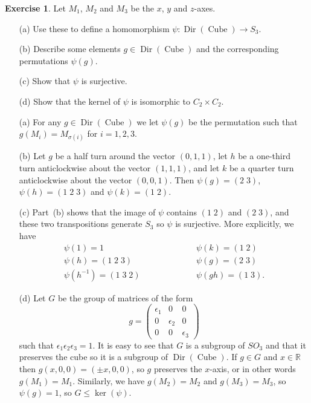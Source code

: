 \documentclass{amsart}
\DeclareMathOperator{\Dir}{Dir}
\DeclareMathOperator{\Cube}{Cube}
\newcommand{\xra}{\xrightarrow}
\renewcommand{\:}{\colon}
\newcommand{\tm}{\times}
\newcommand{\bsm}       {\left(\begin{smallmatrix}}
\newcommand{\esm}       {\end{smallmatrix}\right)}
\newcommand{\R}{\mathbb{R}}
\newcommand{\ep}        {\epsilon}
\newcommand{\sg}        {\sigma}
\theoremstyle{definition}
\newtheorem{exercise}{Exercise}
\newenvironment{solution}{{\noindent\bf Solution:}}{}
\begin{document}
\begin{exercise}
 Let $M_1$, $M_2$ and $M_3$ be the $x$, $y$ and $z$-axes.  
 \begin{itemize}
 \item[(a)] Use these to define a homomorphism
  $\psi\:\Dir(\Cube)\xra{}S_3$.
 \item[(b)] Describe some elements $g\in\Dir(\Cube)$ and the
  corresponding permutations $\psi(g)$.
 \item[(c)] Show that $\psi$ is surjective.
 \item[(d)] Show that the kernel of $\psi$ is isomorphic to
  $C_2\tm C_2$. 
 \end{itemize}
\end{exercise}
\begin{solution}
 \begin{itemize}
 \item[(a)] For any $g\in\Dir(\Cube)$ we let $\psi(g)$ be the
  permutation such that $g(M_i)=M_{\sg(i)}$ for $i=1,2,3$.
 \item[(b)] Let $g$ be a half turn around the vector $(0,1,1)$, let
  $h$ be a one-third turn anticlockwise about the vector $(1,1,1)$,
  and let $k$ be a quarter turn anticlockwise about the vector
  $(0,0,1)$.  Then $\psi(g)=(2\; 3)$, $\psi(h)=(1\;2\;3)$ and
  $\psi(k)=(1\; 2)$.
 \item[(c)] Part~(b) shows that the image of $\psi$ contains $(1\;2)$
  and $(2\; 3)$, and these two transpositions generate $S_3$ so $\psi$
  is surjective.  More explicitly, we have
  \[ \begin{array}{lcr}
   \psi(1)      = 1         & \hspace{5em} & \psi(k)  = (1\;2) \\
   \psi(h)      = (1\;2\;3) &              & \psi(g)  = (2\;3) \\
   \psi(h^{-1}) = (1\;3\;2) &              & \psi(gh) = (1\;3).
  \end{array} \]
 \item[(d)] Let $G$ be the group of matrices of the form 
  \[ g = \bsm \ep_1 & 0 & 0 \\ 0 & \ep_2 & 0 \\ 0 & 0 & \ep_3 \esm \]
  such that $\ep_1\ep_2\ep_3=1$.  It is easy to see that $G$ is a
  subgroup of $SO_3$ and that it preserves the cube so it is a
  subgroup of $\Dir(\Cube)$.  If $g\in G$ and $x\in\R$ then
  $g(x,0,0)=(\pm x,0,0)$, so $g$ preserves the $x$-axis, or in other
  words $g(M_1)=M_1$.  Similarly, we have $g(M_2)=M_2$ and
  $g(M_3)=M_3$, so $\psi(g)=1$, so $G\leq\ker(\psi)$.
 

\end{itemize}
\end{solution}
\end{document}
